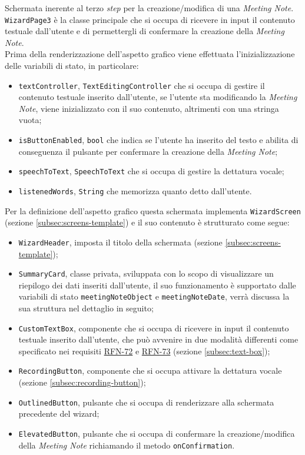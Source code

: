 Schermata inerente al terzo \emph{step} per la creazione/modifica di una \emph{Meeting Note}. \\
\lstinline{WizardPage3} è la classe principale che si occupa di ricevere in input il contenuto testuale dall'utente e di permettergli di confermare la creazione della \emph{Meeting Note}. \\
Prima della renderizzazione dell'aspetto grafico viene effettuata l'inizializzazione delle variabili di stato, in particolare:
\begin{itemize}
    \item \lstinline{textController}, \lstinline{TextEditingController} che si occupa di gestire il contenuto testuale inserito dall'utente, se l'utente sta modificando la \emph{Meeting Note}, viene inizializzato con il suo contenuto, altrimenti con una stringa vuota;
    \item \lstinline{isButtonEnabled}, \lstinline{bool} che indica se l'utente ha inserito del testo e abilita di conseguenza il pulsante per confermare la creazione della \emph{Meeting Note};
    \item \lstinline{speechToText}, \lstinline{SpeechToText} che si occupa di gestire la dettatura vocale;
    \item \lstinline{listenedWords}, \lstinline{String} che memorizza quanto detto dall'utente.
\end{itemize}
Per la definizione dell'aspetto grafico questa schermata implementa \lstinline{WizardScreen} (sezione \ref{subsec:screens-template}) e il suo contenuto è strutturato come segue:
\begin{itemize}
    \item \lstinline{WizardHeader}, imposta il titolo della schermata (sezione \ref{subsec:screens-template});
    \item \lstinline{SummaryCard}, classe privata, sviluppata con lo scopo di visualizzare un riepilogo dei dati inseriti dall'utente, il suo funzionamento è supportato dalle variabili di stato \lstinline{meetingNoteObject} e \lstinline{meetingNoteDate}, verrà discussa la sua struttura nel dettaglio in seguito;
    \item \lstinline{CustomTextBox}, componente che si occupa di ricevere in input il contenuto testuale inserito dall'utente, che può avvenire in due modalità differenti come specificato nei requisiti \hyperref[RFN-72]{RFN-72} e \hyperref[RFN-73]{RFN-73} (sezione \ref{subsec:text-box});
    \item \lstinline{RecordingButton}, componente che si occupa attivare la dettatura vocale (sezione \ref{subsec:recording-button});
    \item \lstinline{OutlinedButton}\cite{site:outline-button}, pulsante che si occupa di renderizzare alla schermata precedente del \gls{wizard}\glsoccur;
    \item \lstinline{ElevatedButton}\cite{site:elevated-button}, pulsante che si occupa di confermare la creazione/modifica della \emph{Meeting Note} richiamando il metodo \lstinline{onConfirmation}.
\end{itemize}
